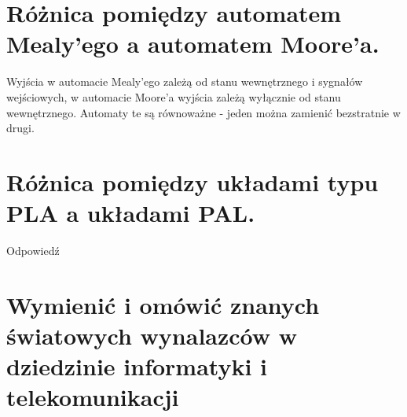 \documentclass[12pt,a4paper]{article}
\begin{document}
	\section{Różnica pomiędzy automatem Mealy'ego a automatem Moore'a.}
	Wyjścia w automacie Mealy'ego zależą od stanu wewnętrznego i sygnałów wejściowych, w automacie Moore'a wyjścia zależą wyłącznie od stanu wewnętrznego. Automaty te są równoważne - jeden można zamienić bezstratnie w drugi.

	\section{Różnica pomiędzy układami typu PLA a układami PAL.}
	Odpowiedź

	\section{Wymienić i omówić znanych światowych wynalazców w dziedzinie informatyki i telekomunikacji}
\end{document}
